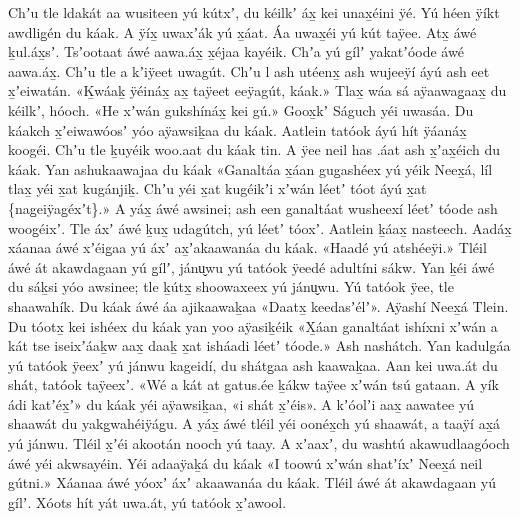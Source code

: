 \begin{pairs}
\begin{Leftside}
Chʼu tle ldakát aa wusiteen yú kútxʼ, du kéilkʼ áx̱ kei unax̱éini ÿé.
Yú héen ÿíkt awdlig̱én du káak.
A ÿíx̱ uwaxʼák yú x̱áat.
Áa uwax̱éi yú kút taÿee.
Atx̱ áwé ḵul.áx̱sʼ.
Tsʼootaat áwé aawa.áx̱ x̱éjaa kayéik.
Chʼa yú g̱ílʼ yakatʼóode áwé aawa.áx̱.
Chʼu tle a kʼiÿeet uwagút.
Chʼu l ash utéenx̱ ash wujeeÿí áyú ash eet x̱ʼeiwatán.
«\!Ḵwáaḵ ÿéináx̱ ax̱ taÿeet eeÿagút, káak.\!»
Tlax̱ wáa sá aÿaawag̱aax̱ du kéilkʼ, hóoch.
«\!He xʼwán gukshínáx̱ kei gú.\!»
Goox̱kʼ Ságuch yéi uwasáa.
Du káakch x̱ʼeiwawóosʼ
yóo aÿawsiḵaa du káak.
Aatlein tatóok áyú hít ÿáanáx̱ koogéi.
\pend
\pstart
{}Chʼu tle ḵuyéik woo.aat du káak tin.
A ÿee neil has .áat ash x̱ʼax̱éich du káak.
Yan ashukaawajaa du káak
«\!Ganaltáa x̱áan gug̱a\-shéex yú yéik Neex̱á, líl tlax̱ yéi x̱at kugánjiḵ.
Chʼu yéi x̱at kugéikʼi xʼwán léetʼ tóot áyú x̱at \{nag̱eiÿag̱éxʼt\}.\!»
A yáx̱ áwé awsinei;
ash een ganaltáat wu\-shee\-xí léetʼ tóode ash woog̱éixʼ.
Tle áxʼ áwé ḵux̱ udagútch, yú léetʼ tóoxʼ.
Aatlein ḵáax̱ nasteech.
\pend
\pstart
{}Aadáx̱ xáanaa áwé xʼéig̱aa yú áxʼ ax̱ʼa\-kaawanáa du káak.
«\!Haadé yú atshéeÿi.\!»
Tléil áwé át akawdagaan yú g̱ílʼ, jánu̬wu yú tatóok ÿeedé adultíni sákw.
Yan ḵéi áwé du sáḵsi yóo awsinee;
tle ḵútx̱ shoowaxeex yú jánu̬wu.
Yú tatóok ÿee, tle shaawahík.
Du káak áwé áa ajikaawaḵaa
«\!Daatx̱ keeda\-sʼélʼ\!».
Aÿashí Nee\-x̱á Tlein.
Du tóotx̱ kei ishéex du káak yan yoo aÿasiḵéik
«\!X̱áan ganaltáat ishíxni xʼwán a kát tse iseixʼáaḵw aax̱ daaḵ x̱at isháadi léetʼ tóode.\!»
Ash nashátch.
\pend
\pstart
{}Yan kadulgáa yú tatóok ÿeexʼ yú jánwu kageidí, du shátg̱aa ash kaawaḵaa.
Aan kei uwa.át du shát, tatóok taÿeexʼ.
«\!Wé a kát at gatus.ée ḵákw taÿee xʼwán tsú gataan.
A yík ádi katʼéx̱ʼ\!» du káak yéi aÿawsiḵaa, «\!i shát x̱ʼéis\!».
A kʼóolʼi aax̱ aawatee yú shaawát du yakg̱wahéiÿág̱u.
A yáx̱ áwé tléil yéi oonéx̱ch yú shaawát, a taaÿí ax̱á yú jánwu.
Tléil x̱ʼéi akootán nooch yú taay.
A xʼaaxʼ, du washtú akawudlaagóoch áwé yéi akwsayéin.
\pend
\pstart
{}Yéi adaaÿaḵá du káak
«\!I toowú xʼwán shatʼíxʼ Neex̱á neil gútni.\!»
Xáanaa áwé yóoxʼ áxʼ akaawanáa du káak.
Tléil áwé át akawdagaan yú g̱ílʼ.
Xóots hít yát uwa.át, yú tatóok x̱ʼawool.

\end{Leftside}
\end{pairs}
